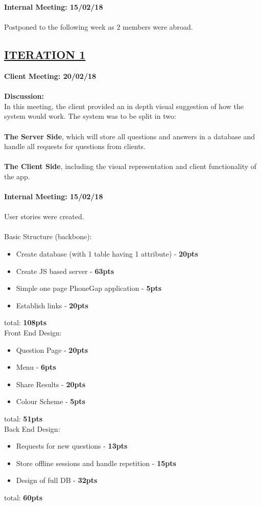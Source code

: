 \documentclass[paper=a4,fontsize=11pt]{article}
\newcommand{\SectionPart}[1]{\subsection*{\uppercase{#1}}}
\begin{document}
\hfill \textbf{Internal Meeting: 15/02/18} \\
\\
Postponed to the following week as 2 members were abroad.

\newpage
\SectionPart{\ul{Iteration 1}}
\hfill \textbf{Client Meeting: 20/02/18} \\
\\
\textbf{Discussion:}\\
\noindent
In this meeting, the client provided an in depth visual suggestion of how the system would work.
The system was to be split in two:\\\\
\noindent
\textbf{The Server Side}, which will store all questions and answers in a database and
handle all requests for questions from clients.\\\\
\noindent
\textbf{The Client Side}, including the visual representation and client functionality of the app.\\\\

\hfill \textbf{Internal Meeting: 15/02/18} \\
\\
User stories were created.\\\\
Basic Structure (backbone):
\begin{itemize}
	\item Create database (with 1 table having 1 attribute) - \textbf{20pts}
	\item Create JS based server - \textbf{63pts}
	\item Simple one page PhoneGap application - \textbf{5pts}
	\item Establish links - \textbf{20pts}
\end{itemize} \hfill total: \textbf{108pts} \\

\noindent
Front End Design:
\begin{itemize}
	\item Question Page - \textbf{20pts}
	\item Menu - \textbf{6pts}
	\item Share Results - \textbf{20pts}
	\item Colour Scheme - \textbf{5pts}
\end{itemize} \hfill total: \textbf{51pts} \\

\noindent
Back End Design:
\begin{itemize}
	\item Requests for new questions - \textbf{13pts}
	\item Store offline sessions and handle repetition - \textbf{15pts}
	\item Design of full DB - \textbf{32pts}
\end{itemize} \hfill total: \textbf{60pts} \\
\end{document}

